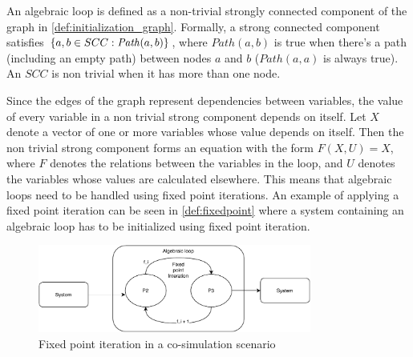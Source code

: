\begin{definition} 
An algebraic loop is defined as a non-trivial strongly connected component of the graph in \cref{def:initialization_graph}.
Formally, a strong connected component satisfies $ \left\{ a,b \in SCC: \mathit{Path}(a,b) \right\}$, where $\mathit{Path}(a,b)$ is true when there's a path (including an empty path) between nodes $a$ and $b$ ($\mathit{Path}(a,a)$ is always true).
An $SCC$ is non trivial when it has more than one node.
\end{definition}

Since the edges of the graph represent dependencies between variables, the value of every variable in a non trivial strong component depends on itself.
Let $X$ denote a vector of one or more variables whose value depends on itself. Then the non trivial strong component forms an equation with the form $F(X, U) = X$, where $F$ denotes the relations between the variables in the loop, and $U$ denotes the variables whose values are calculated elsewhere.
This means that algebraic loops need to be handled using fixed point iterations\cite{Gomes2018}. 
An example of applying a fixed point iteration can be seen in \cref{def:fixedpoint} where a system containing an algebraic loop has to be initialized using fixed point iteration.

\begin{figure}
    \centering
    \includegraphics[width=0.8\textwidth]{images/fixedpoint.pdf}
    \caption{Fixed point iteration in a co-simulation scenario}
    \label{fig:fixedpont}
\end{figure}

